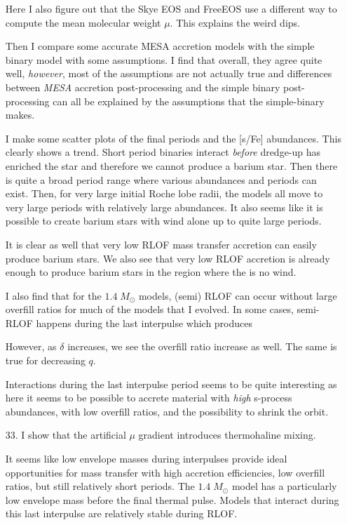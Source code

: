 \documentclass[a4paper,10pt]{article}
\begin{document}
\begin{enumerate}
	      Here I also figure out that the Skye EOS \citep{jermyn2021} and FreeEOS use a different way to
	      compute the mean molecular weight \(\mu \).
	      This explains the weird dips.

	      Then I compare some accurate MESA accretion models with the simple binary model with some assumptions.
	      I find that overall, they agree quite well, \emph{however}, most of the assumptions are not
	      actually true and differences between \emph{MESA} accretion post-processing and the simple binary post-processing can all be explained by the assumptions that the simple-binary makes.

	      I make some scatter plots of the final periods and the [s/Fe] abundances.
	      This clearly shows
	      a trend.
	      Short period binaries interact \emph{before} dredge-up has enriched the star and therefore
	      we cannot produce a barium star.
	      Then there is quite a broad period range where various abundances and periods can exist.
	      Then, for very large initial Roche lobe radii, the models all move to very large periods with relatively large abundances.
	      It also seems like it is possible to create barium stars with
	      wind alone up to quite large periods.

	      It is clear as well that very low RLOF mass transfer accretion can easily produce barium stars.
	      We also see that very low RLOF accretion is already enough to produce barium stars in the region where the is no wind.

	      I also find that for the \(1.4\; M_\odot \) models, (semi) RLOF can occur without large overfill ratios for much of the models that I evolved.
	      In some cases, semi-RLOF happens during the last interpulse which produces

	      However, as \(\delta \) increases, we see the overfill ratio increase as well.
	      The same is true for decreasing \(q\).

	      Interactions during the last interpulse period seems to be quite interesting as here
	      it seems to be possible to accrete material with \emph{high} s-process abundances,
	      with low overfill ratios, and the possibility to shrink the orbit.
	\item[\color{keywordscolor}33.] I show that the artificial \(\mu \) gradient introduces
	      thermohaline mixing.

	      It seems like low envelope masses during interpulses provide ideal opportunities for
	      mass transfer with high accretion efficiencies, low overfill ratios, but still
	      relatively short periods.
	      The \(1.4\; M_\odot \) model has a particularly low
	      envelope mass before the final thermal pulse.
	      Models that interact during this
	      last interpulse are relatively stable during RLOF.


\end{enumerate}
\end{document}
